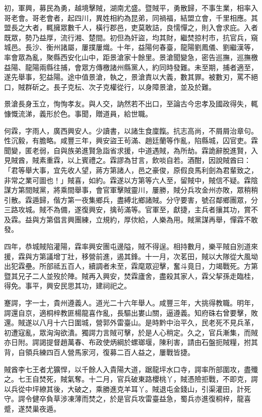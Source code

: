 \begin{pinyinscope}
初，軍興，募民為勇，越境擊賊，湖南尤盛。暨賊平，勇散歸，不事生業，相率入哥老會。哥老會者，起四川，異姓相約為昆弟，同禍福，結盟立會，千里相應。其盟長之大者，輒擁眾數千人，橫行郡邑，吏莫敢詰，良懦憚之，則入會求庇。入者既眾，勢乃益厚，流行湘、楚間。初但為奸盜，均其財，繼焚掠村市，抗官兵，窺城邑。長沙、衡州諸屬，屢撲屢熾。十年，益陽何春臺，龍陽劉鳳儀、劉繼漢等，率會眾為亂，聚縣西安化山中，距景滄家十餘里。景滄聞變急，密告巡撫，巡撫檄益陽、龍陽兩縣往捕，會眾方傳檄諸州縣黨人，約同時發難。未至期，捕者適至，遂先舉事，犯益陽。途中值景滄，執之，景滄責以大義，數其罪。被數刃，罵不絕口，賊群斫之。長子克枟、次子克權從行，以身障景滄，並及於難。

景滄長身玉立，恂恂孝友。與人交，訥然若不出口，至論古今忠孝及國政得失，輒慷慨流涕，義形於色。事聞，贈道員，給世職。

何霖，字雨人，廣西興安人。少讀書，以諸生食廩餼。抗志高尚，不屑屑治章句。性沉毅，有膽略。咸豐三年，興安盜王茍滿、趙廷蘭等作亂，陷縣城，囚官吏。霖聞變，匿老弱，自與族弟進賢急詣省求援，中道遇賊，為所劫。霖詭辭脫進賢，入見賊酋，賊素重霖，以上賓禮之。霖謬為甘言，飲啖自若。酒酣，因說賊酋曰：「君等舉大事，宜先收人望，蔣方第諸人，邑之豪俊，原假良馬利劍為君輩致之，非常之業可圖也！」賊喜，如約。霖遂以方第等六人至，留賊中，賊信不疑。霖陰謀方第間賊黨，將乘間舉事，會官軍擊賊靈川，屢勝，賊分兵攻金州亦敗，眾稍稍引散。霖遁歸，偕方第一夜集鄉兵，盡縛北鄉諸賊。分守要害，號召鄰鄉團眾，分三路攻城。賊不為備，遂復興安，擒茍滿等。官軍至，獻捷，主兵者攘其功，賞不及霖。益與方第倡言興團練，立規約，厚佽給，人樂為用。賊黨謀再舉，憚霖不敢發。

四年，恭城賊陷灌陽，霖率興安團屯邊隘，賊不得逞。相持數月，樂平賊自別道來援，霖與方第議增丁壯，移營前進，遏其鋒。十一月，次茗田，賊以大隊從大風坳出犯霖壘。所部祗五百人，續調者未至，霖麾眾迎擊，奮斗竟日，力竭戰死。方第暨其兄子二人並歿於陣。賊再入興安，焚霖廬舍，盡殺其家人，霖父挈孫走臨桂，得免。事平，興安民思其功，建祠祀之。

蹇諤，字一士，貴州遵義人。道光二十六年舉人。咸豐三年，大挑得教職。明年，諤還自京，適桐梓教匪楊龍喜作亂，長驅出婁山關，逼遵義。知府硃右曾要擊，敗還。賊遂以八月十六日圍城，營郭外雷臺山。是時黔中治平久，民老死不見兵革，初遭寇亂，眾洶洶欲潰。獨諤力言賊可擊，於是人心稍定。久之，官兵漸集，而賊亦日附。諤謁提督趙萬春、布政使炳綱於螺瑯堰，陳利害，請由石盤扼賊糧，拊其背，自領兵練四百人營馬家河，復募二百人益之，屢戰皆捷。

賊酋李七王者尤獷悍，以千餘人入貴陽大道，踞龍坪水口寺，諤率所部圍攻，盡殲之。七王自焚死，賊氣奪。十二月，官兵破東路櫻桃丫，賊憑險拒戰，不即克，諤以兵從中坪繚其後，大破之，乘勝進克羊耳丫。賊退屯金錢山，引渠灌田，計死守。諤令健卒負草涉凍薄而焚之，於是官兵攻雷臺益急，蜀兵亦進復桐梓，龍喜蹙，遂焚巢夜遁。


\end{pinyinscope}
